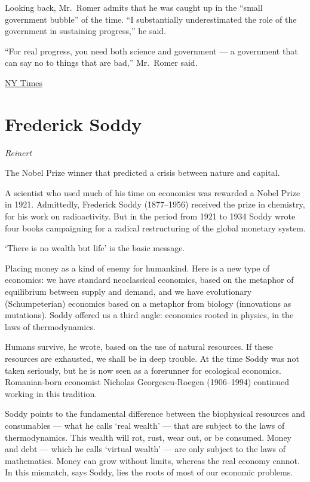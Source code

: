 \documentclass[
]{book}
\begin{document}
Looking back, Mr.~Romer admits that he was caught up in the ``small government bubble'' of the time. ``I substantially underestimated the role of the government in sustaining progress,'' he said.

``For real progress, you need both science and government --- a government that can say no to things that are bad,'' Mr.~Romer said.

\href{https://www.nytimes.com/2021/05/20/technology/tech-antitrust-paul-romer.html}{NY Times}

\hypertarget{frederick-soddy}{%
\section{Frederick Soddy}\label{frederick-soddy}}

\emph{Reinert}

The Nobel Prize winner that predicted a crisis between nature and capital.

A scientist who used much of his time on economics was rewarded a Nobel Prize in 1921. Admittedly, Frederick Soddy (1877--1956) received the prize in chemistry, for his work on radioactivity. But in the period from 1921 to 1934 Soddy wrote four books campaigning for a radical restructuring of the global monetary system.

`There is no wealth but life' is the basic message.

Placing money as a kind of enemy for humankind. Here is a new type of economics: we have standard neoclassical economics, based on the metaphor of equilibrium between supply and demand, and we have evolutionary (Schumpeterian) economics based on a metaphor from biology (innovations as mutations). Soddy offered us a third angle: economics rooted in physics, in the laws of thermodynamics.

Humans survive, he wrote, based on the use of natural resources. If these resources are exhausted, we shall be in deep trouble. At the time Soddy was not taken seriously, but he is now seen as a forerunner for ecological economics. Romanian-born economist Nicholas Georgescu-Roegen (1906--1994) continued working in this tradition.

Soddy points to the fundamental difference between the biophysical resources and consumables --- what he calls `real wealth' --- that are subject to the laws of thermodynamics. This wealth will rot, rust, wear out, or be consumed. Money and debt --- which he calls `virtual wealth' --- are only subject to the laws of mathematics. Money can grow without limits, whereas the real economy cannot. In this mismatch, says Soddy, lies the roots of most of our economic problems.
\end{document}
